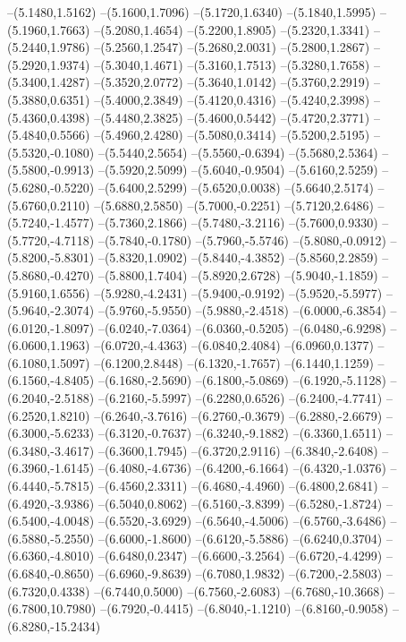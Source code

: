 {\begin{scope}
--(5.1480,1.5162)
--(5.1600,1.7096)
--(5.1720,1.6340)
--(5.1840,1.5995)
--(5.1960,1.7663)
--(5.2080,1.4654)
--(5.2200,1.8905)
--(5.2320,1.3341)
--(5.2440,1.9786)
--(5.2560,1.2547)
--(5.2680,2.0031)
--(5.2800,1.2867)
--(5.2920,1.9374)
--(5.3040,1.4671)
--(5.3160,1.7513)
--(5.3280,1.7658)
--(5.3400,1.4287)
--(5.3520,2.0772)
--(5.3640,1.0142)
--(5.3760,2.2919)
--(5.3880,0.6351)
--(5.4000,2.3849)
--(5.4120,0.4316)
--(5.4240,2.3998)
--(5.4360,0.4398)
--(5.4480,2.3825)
--(5.4600,0.5442)
--(5.4720,2.3771)
--(5.4840,0.5566)
--(5.4960,2.4280)
--(5.5080,0.3414)
--(5.5200,2.5195)
--(5.5320,-0.1080)
--(5.5440,2.5654)
--(5.5560,-0.6394)
--(5.5680,2.5364)
--(5.5800,-0.9913)
--(5.5920,2.5099)
--(5.6040,-0.9504)
--(5.6160,2.5259)
--(5.6280,-0.5220)
--(5.6400,2.5299)
--(5.6520,0.0038)
--(5.6640,2.5174)
--(5.6760,0.2110)
--(5.6880,2.5850)
--(5.7000,-0.2251)
--(5.7120,2.6486)
--(5.7240,-1.4577)
--(5.7360,2.1866)
--(5.7480,-3.2116)
--(5.7600,0.9330)
--(5.7720,-4.7118)
--(5.7840,-0.1780)
--(5.7960,-5.5746)
--(5.8080,-0.0912)
--(5.8200,-5.8301)
--(5.8320,1.0902)
--(5.8440,-4.3852)
--(5.8560,2.2859)
--(5.8680,-0.4270)
--(5.8800,1.7404)
--(5.8920,2.6728)
--(5.9040,-1.1859)
--(5.9160,1.6556)
--(5.9280,-4.2431)
--(5.9400,-0.9192)
--(5.9520,-5.5977)
--(5.9640,-2.3074)
--(5.9760,-5.9550)
--(5.9880,-2.4518)
--(6.0000,-6.3854)
--(6.0120,-1.8097)
--(6.0240,-7.0364)
--(6.0360,-0.5205)
--(6.0480,-6.9298)
--(6.0600,1.1963)
--(6.0720,-4.4363)
--(6.0840,2.4084)
--(6.0960,0.1377)
--(6.1080,1.5097)
--(6.1200,2.8448)
--(6.1320,-1.7657)
--(6.1440,1.1259)
--(6.1560,-4.8405)
--(6.1680,-2.5690)
--(6.1800,-5.0869)
--(6.1920,-5.1128)
--(6.2040,-2.5188)
--(6.2160,-5.5997)
--(6.2280,0.6526)
--(6.2400,-4.7741)
--(6.2520,1.8210)
--(6.2640,-3.7616)
--(6.2760,-0.3679)
--(6.2880,-2.6679)
--(6.3000,-5.6233)
--(6.3120,-0.7637)
--(6.3240,-9.1882)
--(6.3360,1.6511)
--(6.3480,-3.4617)
--(6.3600,1.7945)
--(6.3720,2.9116)
--(6.3840,-2.6408)
--(6.3960,-1.6145)
--(6.4080,-4.6736)
--(6.4200,-6.1664)
--(6.4320,-1.0376)
--(6.4440,-5.7815)
--(6.4560,2.3311)
--(6.4680,-4.4960)
--(6.4800,2.6841)
--(6.4920,-3.9386)
--(6.5040,0.8062)
--(6.5160,-3.8399)
--(6.5280,-1.8724)
--(6.5400,-4.0048)
--(6.5520,-3.6929)
--(6.5640,-4.5006)
--(6.5760,-3.6486)
--(6.5880,-5.2550)
--(6.6000,-1.8600)
--(6.6120,-5.5886)
--(6.6240,0.3704)
--(6.6360,-4.8010)
--(6.6480,0.2347)
--(6.6600,-3.2564)
--(6.6720,-4.4299)
--(6.6840,-0.8650)
--(6.6960,-9.8639)
--(6.7080,1.9832)
--(6.7200,-2.5803)
--(6.7320,0.4338)
--(6.7440,0.5000)
--(6.7560,-2.6083)
--(6.7680,-10.3668)
--(6.7800,10.7980)
--(6.7920,-0.4415)
--(6.8040,-1.1210)
--(6.8160,-0.9058)
--(6.8280,-15.2434)

\end{scope}}
